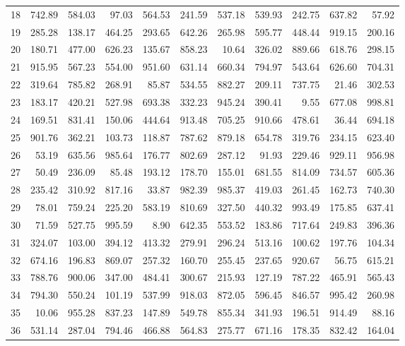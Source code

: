 \documentclass[12pt]{../SOP3_beta}\usepackage[]{graphicx}\usepackage[]{color}
\begin{document}
\begin{table}[ht]
\begin{tabular}{rrrrrrrrrrr}
  18 & 742.89 & 584.03 & 97.03 & 564.53 & 241.59 & 537.18 & 539.93 & 242.75 & 637.82 & 57.92 \\ 
  19 & 285.28 & 138.17 & 464.25 & 293.65 & 642.26 & 265.98 & 595.77 & 448.44 & 919.15 & 200.16 \\ 
  20 & 180.71 & 477.00 & 626.23 & 135.67 & 858.23 & 10.64 & 326.02 & 889.66 & 618.76 & 298.15 \\ 
  21 & 915.95 & 567.23 & 554.00 & 951.60 & 631.14 & 660.34 & 794.97 & 543.64 & 626.60 & 704.31 \\ 
  22 & 319.64 & 785.82 & 268.91 & 85.87 & 534.55 & 882.27 & 209.11 & 737.75 & 21.46 & 302.53 \\ 
  23 & 183.17 & 420.21 & 527.98 & 693.38 & 332.23 & 945.24 & 390.41 & 9.55 & 677.08 & 998.81 \\ 
  24 & 169.51 & 831.41 & 150.06 & 444.64 & 913.48 & 705.25 & 910.66 & 478.61 & 36.44 & 694.18 \\ 
  25 & 901.76 & 362.21 & 103.73 & 118.87 & 787.62 & 879.18 & 654.78 & 319.76 & 234.15 & 623.40 \\ 
  26 & 53.19 & 635.56 & 985.64 & 176.77 & 802.69 & 287.12 & 91.93 & 229.46 & 929.11 & 956.98 \\ 
  27 & 50.49 & 236.09 & 85.48 & 193.12 & 178.70 & 155.01 & 681.55 & 814.09 & 734.57 & 605.36 \\ 
  28 & 235.42 & 310.92 & 817.16 & 33.87 & 982.39 & 985.37 & 419.03 & 261.45 & 162.73 & 740.30 \\ 
  29 & 78.01 & 759.24 & 225.20 & 583.19 & 810.69 & 327.50 & 440.32 & 993.49 & 175.85 & 637.41 \\ 
  30 & 71.59 & 527.75 & 995.59 & 8.90 & 642.35 & 553.52 & 183.86 & 717.64 & 249.83 & 396.36 \\ 
  31 & 324.07 & 103.00 & 394.12 & 413.32 & 279.91 & 296.24 & 513.16 & 100.62 & 197.76 & 104.34 \\ 
  32 & 674.16 & 196.83 & 869.07 & 257.32 & 160.70 & 255.45 & 237.65 & 920.67 & 56.75 & 615.21 \\ 
  33 & 788.76 & 900.06 & 347.00 & 484.41 & 300.67 & 215.93 & 127.19 & 787.22 & 465.91 & 565.43 \\ 
  34 & 794.30 & 550.24 & 101.19 & 537.99 & 918.03 & 872.05 & 596.45 & 846.57 & 995.42 & 260.98 \\ 
  35 & 10.06 & 955.28 & 837.23 & 147.89 & 549.78 & 855.34 & 341.93 & 196.51 & 914.49 & 88.16 \\ 
  36 & 531.14 & 287.04 & 794.46 & 466.88 & 564.83 & 275.77 & 671.16 & 178.35 & 832.42 & 164.04 \\ 

\end{tabular}
\end{table}
\end{document}
